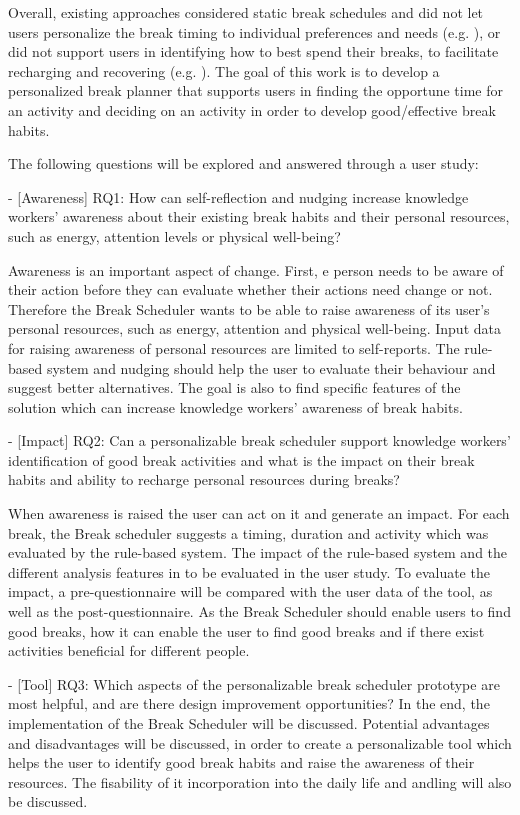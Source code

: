 \documentclass{hasel_thesis}
\begin{document}
Overall, existing approaches considered static break schedules and did not let users personalize the break timing to individual preferences and needs (e.g. \cite{Henning.1997} \cite{Cooley.2013}), or did not  support users in identifying how to best spend their breaks, to facilitate recharging and recovering (e.g. \cite{Kaur.2020}). 
The goal of this work is to develop a personalized break planner that supports users in finding the opportune time for an activity and deciding on an activity in order to develop good/effective break habits. 


The following questions will be explored and answered through a user study:

-	[Awareness] RQ1: How can self-reflection and nudging increase knowledge workers' awareness about their existing break habits and their personal resources, such as energy, attention levels or physical well-being?

Awareness is an important aspect of change. First, e person needs to be aware of their action before they can evaluate whether their actions need change or not. Therefore the Break Scheduler wants to be able to raise awareness of its user's personal resources, such as energy, attention and physical well-being. Input data for raising awareness of personal resources are limited to self-reports. The rule-based system and nudging should help the user to evaluate their behaviour and suggest better alternatives. The goal is also to find specific features of the solution which can increase knowledge workers' awareness of break habits.


-	[Impact] RQ2: Can a personalizable break scheduler support knowledge workers' identification of good break activities and what is the impact on their break habits and ability to recharge personal resources during breaks?

When awareness is raised the user can act on it and generate an impact. For each break, the Break scheduler suggests a timing, duration and activity which was evaluated by the rule-based system. The impact of the rule-based system and the different analysis features in to be evaluated in the user study. To evaluate the impact, a pre-questionnaire will be compared with the user data of the tool, as well as the post-questionnaire. As the Break Scheduler should enable users to find good breaks, how it can enable the user to find good breaks and if there exist activities beneficial for different people.


-	[Tool] RQ3: Which aspects of the personalizable break scheduler prototype are most helpful, and are there design improvement opportunities?
In the end, the implementation of the Break Scheduler will be discussed. Potential advantages and disadvantages will be discussed, in order to create a personalizable tool which helps the user to identify good break habits and raise the awareness of their resources. The fisability of it incorporation into the daily life and andling will also be discussed.
\end{document}
